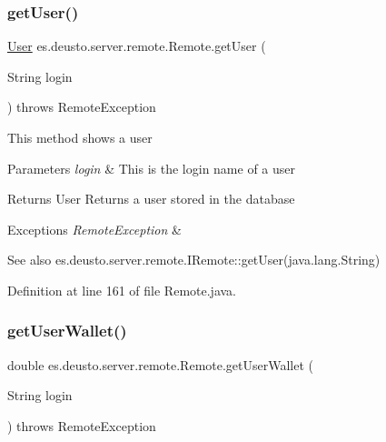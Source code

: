 \subsubsection{\texorpdfstring{get\+User()}{getUser()}}
{\footnotesize\ttfamily \hyperlink{classes_1_1deusto_1_1server_1_1db_1_1data_1_1_user}{User} es.\+deusto.\+server.\+remote.\+Remote.\+get\+User (\begin{DoxyParamCaption}\item[{String}]{login }\end{DoxyParamCaption}) throws Remote\+Exception}

This method shows a user 
\begin{DoxyParams}{Parameters}
{\em login} & This is the login name of a user \\
\hline
\end{DoxyParams}
\begin{DoxyReturn}{Returns}
User Returns a user stored in the database 
\end{DoxyReturn}

\begin{DoxyExceptions}{Exceptions}
{\em Remote\+Exception} & \\
\hline
\end{DoxyExceptions}
\begin{DoxySeeAlso}{See also}
es.\+deusto.\+server.\+remote.\+I\+Remote\+::get\+User(java.\+lang.\+String) 
\end{DoxySeeAlso}


Definition at line 161 of file Remote.\+java.

\mbox{\label{classes_1_1deusto_1_1server_1_1remote_1_1_remote_af7cc190cccf69cda838a6d9805c5c2f5}} 
\subsubsection{\texorpdfstring{get\+User\+Wallet()}{getUserWallet()}}
{\footnotesize\ttfamily double es.\+deusto.\+server.\+remote.\+Remote.\+get\+User\+Wallet (\begin{DoxyParamCaption}\item[{String}]{login }\end{DoxyParamCaption}) throws Remote\+Exception}

